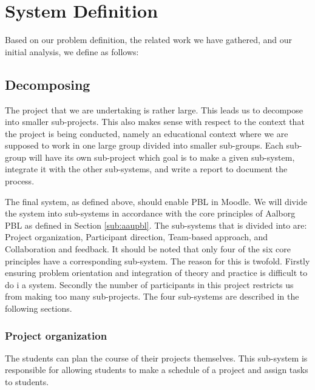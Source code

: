 \section{System Definition}
\label{sec:systemDef}
Based on our problem definition, the related work we have gathered, and our initial analysis, we define \system as follows:












\subsection{Decomposing \system}
\label{sub:decomposingSys}
The project that we are undertaking is rather large.
This leads us to decompose into smaller sub-projects.
This also makes sense with respect to the context that the project is being conducted, namely an educational context where we are supposed to work in one large group divided into smaller sub-groups.
Each sub-group will have its own sub-project which goal is to make a given sub-system, integrate it with the other sub-systems, and write a report to document the process.

The final system, as defined above, should enable PBL in Moodle.
We will divide the system into sub-systems in accordance with the core principles of Aalborg PBL as defined in Section \ref{sub:aaupbl}.
The sub-systems that \system is divided into are:
Project organization,
Participant direction,
Team-based approach, and
Collaboration and feedback.
It should be noted that only four of the six core principles have a corresponding sub-system.
The reason for this is twofold.
Firstly ensuring problem orientation and integration of theory and practice is difficult to do i a system.
Secondly the number of participants in this project restricts us from making too many sub-projects.
The four sub-systems are described in the following sections.

\subsubsection{Project organization}
The students can plan the course of their projects themselves.
This sub-system is responsible for allowing students to make a schedule of a project and assign tasks to students.

